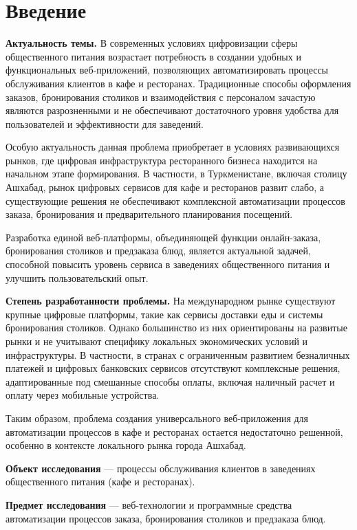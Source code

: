 \section*{Введение}

\textbf{Актуальность темы.}  
В современных условиях цифровизации сферы общественного питания возрастает потребность в создании удобных и функциональных веб-приложений, позволяющих автоматизировать процессы обслуживания клиентов в кафе и ресторанах. Традиционные способы оформления заказов, бронирования столиков и взаимодействия с персоналом зачастую являются разрозненными и не обеспечивают достаточного уровня удобства для пользователей и эффективности для заведений.

Особую актуальность данная проблема приобретает в условиях развивающихся рынков, где цифровая инфраструктура ресторанного бизнеса находится на начальном этапе формирования. В частности, в Туркменистане, включая столицу Ашхабад, рынок цифровых сервисов для кафе и ресторанов развит слабо, а существующие решения не обеспечивают комплексной автоматизации процессов заказа, бронирования и предварительного планирования посещений.

Разработка единой веб-платформы, объединяющей функции онлайн-заказа, бронирования столиков и предзаказа блюд, является актуальной задачей, способной повысить уровень сервиса в заведениях общественного питания и улучшить пользовательский опыт.

\textbf{Степень разработанности проблемы.}  
На международном рынке существуют крупные цифровые платформы, такие как сервисы доставки еды и системы бронирования столиков. Однако большинство из них ориентированы на развитые рынки и не учитывают специфику локальных экономических условий и инфраструктуры. В частности, в странах с ограниченным развитием безналичных платежей и цифровых банковских сервисов отсутствуют комплексные решения, адаптированные под смешанные способы оплаты, включая наличный расчет и оплату через мобильные устройства.

Таким образом, проблема создания универсального веб-приложения для автоматизации процессов в кафе и ресторанах остается недостаточно решенной, особенно в контексте локального рынка города Ашхабад.

\textbf{Объект исследования} — процессы обслуживания клиентов в заведениях общественного питания (кафе и ресторанах).

\textbf{Предмет исследования} — веб-технологии и программные средства автоматизации процессов заказа, бронирования столиков и предзаказа блюд.

